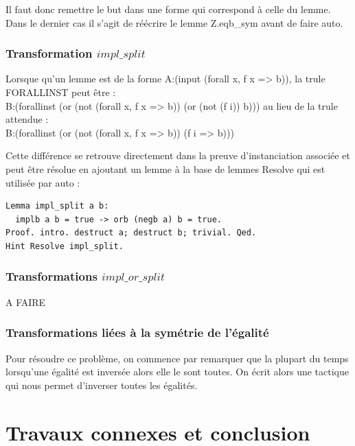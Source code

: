 \documentclass[11pt]{article}
\begin{document}
Il faut donc remettre le but dans une forme qui correspond à celle du lemme. Dans le dernier cas il s'agit de réécrire le lemme Z.eqb\_sym avant de faire auto.

\subsubsection{Transformation $impl\_split$}

Lorsque qu'un lemme est de la forme A:(input (forall x, f x => b)), la trule FORALLINST peut être :\\
B:(forallinst (or (not (forall x, f x => b)) (or (not (f i)) b)))
au lieu de la trule attendue : \\
B:(forallinst (or (not (forall x, f x => b)) (f i => b)))

Cette différence se retrouve directement dans la preuve d'instanciation associée et peut être résolue en ajoutant un lemme à la base de lemmes Resolve qui est utilisée par auto :

\begin{lstlisting}[frame=single]
Lemma impl_split a b:
  implb a b = true -> orb (negb a) b = true.
Proof. intro. destruct a; destruct b; trivial. Qed.
Hint Resolve impl_split.
\end{lstlisting}

\subsubsection{Transformations $impl\_or\_split$}

A FAIRE

\subsubsection{Transformations liées à la symétrie de l'égalité}

Pour résoudre ce problème, on commence par remarquer que la plupart du temps lorsqu'une égalité est inversée alors elle le sont toutes. On écrit alors une tactique qui nous permet d'inverser toutes les égalités. 


\section{Travaux connexes et conclusion}
\end{document}
